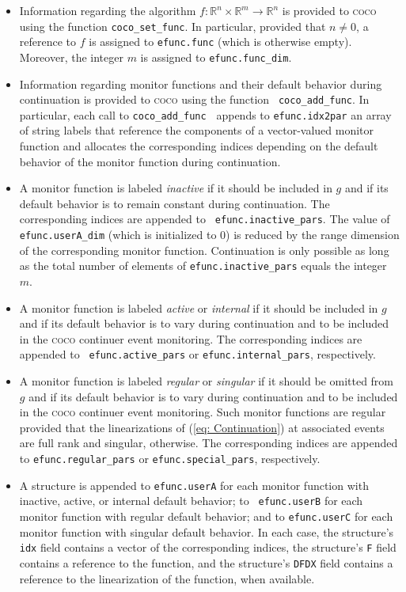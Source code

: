 \documentclass{article}
\begin{document}
\begin{itemize}
\item Information regarding the algorithm $f:\mathbb{R}^{n}\times \mathbb{R}%
^{m}\rightarrow \mathbb{R}^{n}$ is provided to \textsc{coco} using the
function \texttt{coco\_set\_func}. In particular, provided that $n\neq 0$, a
reference to $f$ is assigned to \texttt{efunc.func} (which is otherwise
empty). Moreover, the integer $m$ is assigned to \texttt{efunc.func\_dim}.

\item Information regarding monitor functions and their default behavior
during continuation is provided to \textsc{coco} using the function \texttt{%
coco\_add\_func}. In particular, each call to \texttt{coco\_add\_func}%
\textbf{\ }appends to \texttt{efunc.idx2par} an array of string labels that
reference the components of a vector-valued monitor function and allocates
the corresponding indices depending on the default behavior of the monitor
function during continuation.

\item A monitor function is labeled \emph{inactive} if it should be included
in $g$ and if its default behavior is to remain constant during
continuation. The corresponding indices are appended to \texttt{%
efunc.inactive\_pars}. The value of \texttt{efunc.userA\_dim} (which is
initialized to $0$) is reduced by the range dimension of the corresponding
monitor function. Continuation is only possible as long as the total number
of elements of \texttt{efunc.inactive\_pars} equals the integer $m$.

\item A monitor function is labeled \emph{active} or \emph{internal }if it
should be included in $g$ and if its default behavior is to vary during
continuation and to be included in the \textsc{coco} continuer event
monitoring. The corresponding indices are appended to \texttt{%
efunc.active\_pars} or \texttt{efunc.internal\_pars}, respectively.

\item A monitor function is labeled \emph{regular} or \emph{singular} if it
should be omitted from $g$ and if its default behavior is to vary during
continuation and to be included in the \textsc{coco} continuer event
monitoring. Such monitor functions are regular provided that the
linearizations of (\ref{eq: Continuation}) at associated events are full
rank and singular, otherwise. The corresponding indices are appended to 
\texttt{efunc.regular\_pars} or \texttt{efunc.special\_pars}, respectively. 

\item A structure is appended to \texttt{efunc.userA} for each monitor
function with inactive, active, or internal default behavior; to \texttt{%
efunc.userB} for each monitor function with regular default behavior; and to 
\texttt{efunc.userC} for each monitor function with singular default
behavior. In each case, the structure's \texttt{idx} field contains a vector
of the corresponding indices, the structure's \texttt{F} field contains a
reference to the function, and the structure's \texttt{DFDX} field contains
a reference to the linearization of the function, when available.
\end{itemize}
\end{document}
